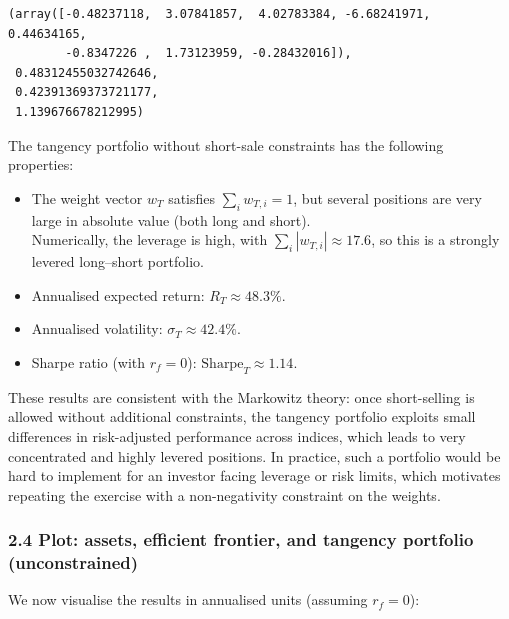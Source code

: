 \documentclass[11pt]{article}
\begin{document}
            \begin{tcolorbox}[breakable, size=fbox, boxrule=.5pt, pad at break*=1mm, opacityfill=0]
\begin{Verbatim}[commandchars=\\\{\}]
(array([-0.48237118,  3.07841857,  4.02783384, -6.68241971,  0.44634165,
        -0.8347226 ,  1.73123959, -0.28432016]),
 0.48312455032742646,
 0.42391369373721177,
 1.139676678212995)
\end{Verbatim}
\end{tcolorbox}
        
    The tangency portfolio without short-sale constraints has the following
properties:

\begin{itemize}
\item
  The weight vector \(w_T\) satisfies \(\sum_i w_{T,i} = 1\), but
  several positions are very large in absolute value (both long and
  short).\\
  Numerically, the leverage is high, with
  \(\sum_i |w_{T,i}| \approx 17.6\), so this is a strongly levered
  long--short portfolio.
\item
  Annualised expected return: \(R_T \approx 48.3\%\).
\item
  Annualised volatility: \(\sigma_T \approx 42.4\%\).
\item
  Sharpe ratio (with \(r_f = 0\)): \(\text{Sharpe}_T \approx 1.14\).
\end{itemize}

These results are consistent with the Markowitz theory: once
short-selling is allowed without additional constraints, the tangency
portfolio exploits small differences in risk-adjusted performance across
indices, which leads to very concentrated and highly levered positions.
In practice, such a portfolio would be hard to implement for an investor
facing leverage or risk limits, which motivates repeating the exercise
with a non-negativity constraint on the weights.

    \hypertarget{plot-assets-efficient-frontier-and-tangency-portfolio-unconstrained}{%
\subsubsection{2.4 Plot: assets, efficient frontier, and tangency
portfolio
(unconstrained)}\label{plot-assets-efficient-frontier-and-tangency-portfolio-unconstrained}}

We now visualise the results in annualised units (assuming \(r_f = 0\)):
\end{document}
